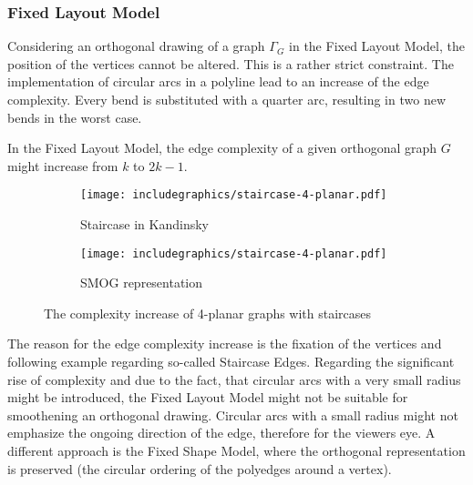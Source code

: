\subsubsection{Fixed Layout Model}
Considering an orthogonal drawing of a graph $\Gamma_G$ in the Fixed Layout Model, the position of the vertices cannot be altered. This is a rather strict constraint. The implementation of circular arcs in a polyline lead to an increase of the edge complexity. Every bend is substituted with a quarter arc, resulting in two new bends in the worst case.
\begin{theorem}
	In the Fixed Layout Model, the edge complexity of a given orthogonal graph $G$ might increase from $k$ to $2k-1$.
\end{theorem}
\begin{figure}[H]
	\centering
	\begin{subfigure}{.4\textwidth}
    \centering
	\texttt{[image: includegraphics/staircase-4-planar.pdf]}
	\caption{Staircase in Kandinsky}	
	\end{subfigure}
\begin{subfigure}{.4\textwidth}
	\centering
	\texttt{[image: includegraphics/staircase-4-planar.pdf]}
	\caption{SMOG representation}
\end{subfigure}
\caption{The complexity increase of 4-planar graphs with staircases}\label{im:4-staircase}
\end{figure}
The reason for the edge complexity increase is the fixation of the vertices and following example regarding so-called \grqq Staircase Edges\grqq.
Regarding the significant rise of complexity and due to the fact, that circular arcs with a very small radius might be introduced, the Fixed Layout Model might not be suitable for smoothening an orthogonal drawing. Circular arcs with a small radius might not emphasize the ongoing direction of the edge, therefore for the viewers eye. A different approach is the Fixed Shape Model, where the orthogonal representation is preserved (the circular ordering of the polyedges around a vertex).
